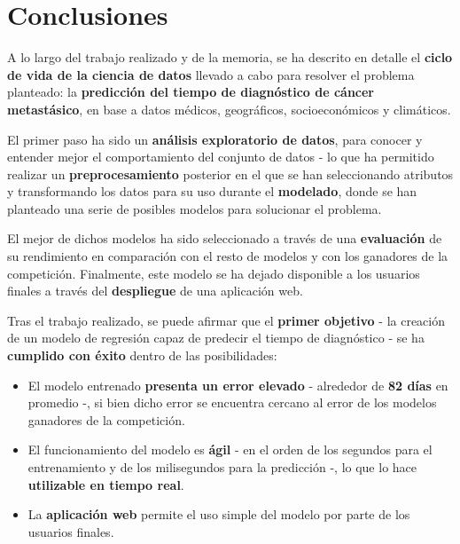 \chapter{Conclusiones}

A lo largo del trabajo realizado y de la memoria, se ha descrito en detalle el \textbf{ciclo de vida de la ciencia de datos} llevado a cabo para resolver el problema planteado: la \textbf{predicción del tiempo de diagnóstico de cáncer metastásico}, en base a datos médicos, geográficos, socioeconómicos y climáticos.

El primer paso ha sido un \textbf{análisis exploratorio de datos}, para conocer y entender mejor el comportamiento del conjunto de datos - lo que ha permitido realizar un \textbf{preprocesamiento} posterior en el que se han seleccionando atributos y transformando los datos para su uso durante el \textbf{modelado}, donde se han planteado una serie de posibles modelos para solucionar el problema. 

El mejor de dichos modelos ha sido seleccionado a través de una \textbf{evaluación} de su rendimiento en comparación con el resto de modelos y con los ganadores de la competición. Finalmente, este modelo se ha dejado disponible a los usuarios finales a través del \textbf{despliegue} de una aplicación web.

Tras el trabajo realizado, se puede afirmar que el \textbf{primer objetivo} - la creación de un modelo de regresión capaz de predecir el tiempo de diagnóstico - se ha \textbf{cumplido con éxito} dentro de las posibilidades:
\begin{itemize}
	\item El modelo entrenado \textbf{presenta un error elevado} - alrededor de \textbf{82 días} en promedio -, si bien dicho error se encuentra cercano al error de los modelos ganadores de la competición.
	\item El funcionamiento del modelo es \textbf{ágil} - en el orden de los segundos para el entrenamiento y de los milisegundos para la predicción -, lo que lo hace \textbf{utilizable en tiempo real}.
	\item La \textbf{aplicación web} permite el uso simple del modelo por parte de los usuarios finales.
\end{itemize}

